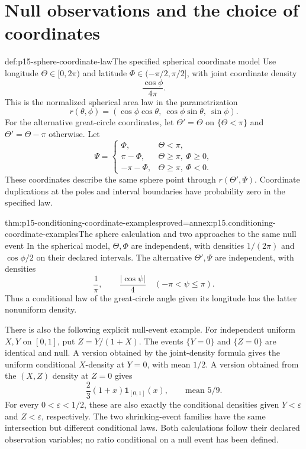\section{Null observations and the choice of coordinates}
\label{sec:p15-conditioning-coordinate-examples}

\begin{hbdefinition}{def:p15-sphere-coordinate-law}{The specified spherical coordinate model}
Use longitude \(\Theta\in[0,2\pi)\) and latitude
\(\Phi\in(-\pi/2,\pi/2]\), with joint coordinate density
\[
                         \frac{\cos\phi}{4\pi}.
\]
This is the normalized spherical area law in the parametrization
\[
 r(\theta,\phi)
       =(\cos\phi\cos\theta,\ \cos\phi\sin\theta,\ \sin\phi).
\]
For the alternative great-circle coordinates, let
\(\Theta'=\Theta\) on \(\{\Theta<\pi\}\) and
\(\Theta'=\Theta-\pi\) otherwise. Let
\[
 \Psi=
 \begin{cases}
  \Phi,&\Theta<\pi,\\
  \pi-\Phi,&\Theta\geq\pi,\ \Phi\geq0,\\
  -\pi-\Phi,&\Theta\geq\pi,\ \Phi<0 .
 \end{cases}
\]
These coordinates describe the same sphere point through \(r(\Theta',\Psi)\).
Coordinate duplications at the poles and interval boundaries have probability
zero in the specified law.
\end{hbdefinition}

\begin{hbtheorem}{thm:p15-conditioning-coordinate-examples}{proved=annex:p15.conditioning-coordinate-examples}{The sphere calculation and two approaches to the same null event}
In the spherical model, \(\Theta,\Phi\) are independent, with densities
\(1/(2\pi)\) and \(\cos\phi/2\) on their declared intervals.
The alternative \(\Theta',\Psi\) are independent, with densities
\[
                          \frac1\pi,\qquad\frac{|\cos\psi|}{4}
                                          \quad(-\pi<\psi\leq\pi).
\]
Thus a conditional law of the great-circle angle given its longitude
has the latter nonuniform density.

There is also the following explicit null-event example.
For independent uniform \(X,Y\) on \([0,1]\), put \(Z=Y/(1+X)\).
The events \(\{Y=0\}\) and \(\{Z=0\}\) are identical and null.
A version obtained by the joint-density formula gives the uniform
conditional \(X\)-density at \(Y=0\), with mean \(1/2\).
A version obtained from the \((X,Z)\) density at \(Z=0\) gives
\[
                       \frac23(1+x)\mathbf1_{[0,1]}(x),
                       \qquad\text{mean }5/9.
\]
For every \(0<\varepsilon<1/2\), these are also exactly the conditional
densities given \(Y<\varepsilon\) and \(Z<\varepsilon\), respectively.
The two shrinking-event families have the same intersection but different
conditional laws. Both calculations follow their declared observation
variables; no ratio conditional on a null event has been defined.
\end{hbtheorem}

